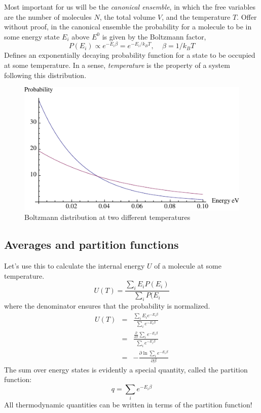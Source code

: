 \documentclass[11pt]{article}
\begin{document}
Most important for us will be the {\em canonical ensemble}, in which the free
variables are the number of molecules $N$, the total volume $V$, and the
temperature $T$.  Offer without proof, in the canonical ensemble the
probability for a molecule to be in some energy state $E_i$ above $E^0$ is
given by the Boltzmann factor,
\begin{equation}
  P(E_i) \propto e^{-E_i\beta}=e^{-E_i/k_BT},~~~~~\beta=1/k_BT
\end{equation}
Defines an exponentially decaying probability function for a state to be
occupied at some temperature.  In a sense, {\em temperature} is the property of
a system following this distribution.
\begin{figure}[h]
  \centering
  \includegraphics{boltzmann}
  \caption{Boltzmann distribution at two different temperatures}
  \label{fig:boltzmann}
\end{figure}

\subsection{Averages and partition functions}
Let's use this to calculate the internal energy $U$ of a molecule at some
temperature.  
\begin{equation}
  U(T)=\frac{\sum_iE_iP(E_i)}{\sum_iP(E_i}
\end{equation}
where the denominator ensures that the probability is normalized.
\begin{eqnarray}
  U(T) & =& \frac{\sum_iE_i e^{-E_i\beta}}{\sum_ie^{-E_i\beta}} \\
  & = & \frac{\frac{\partial}{\partial\beta}\sum_ie^{-E_i\beta}}{\sum_ie^{-E_i
      \beta}}\\
& = & -\frac{\partial \ln \sum_i e^{-E_i\beta}}{\partial \beta}
\end{eqnarray}
The sum over energy states is evidently a special quantity, called the
partition function:
\begin{equation}
  q=\sum_ie^{-E_i\beta}
\end{equation}
All thermodynamic quantities can be written in terms of the partition function!
\end{document}
